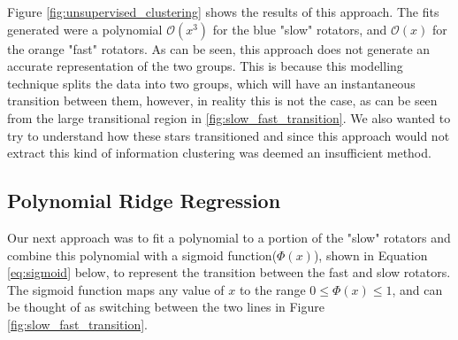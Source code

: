 \documentclass[fleqn,usenatbib]{mnras}
\begin{document}
Figure \ref{fig:unsupervised_clustering} shows the results of this approach.
The fits generated were a polynomial $\mathcal{O}(x^3)$ for the blue "slow" rotators, and $\mathcal{O}(x)$ for the orange "fast" rotators.
As can be seen, this approach does not generate an accurate representation of the two groups.
This is because this modelling technique splits the data into two groups, which will have an instantaneous transition between them, however, in reality this is not the case, as can be seen from the large transitional region in \ref{fig:slow_fast_transition}.
We also wanted to try to understand how these stars transitioned and since this approach would not extract this kind of information clustering was deemed an insufficient method.

\subsection{Polynomial Ridge Regression}
Our next approach was to fit a polynomial to a portion of the "slow" rotators and combine this polynomial with a sigmoid function($\Phi\left(x\right)$), shown in Equation \ref{eq:sigmoid} below, to represent the transition between the fast and slow rotators.
The sigmoid function maps any value of $x$ to the range $ 0 \leq \Phi\left(x\right) \leq 1$, and can be thought of as switching between the two lines in Figure \ref{fig:slow_fast_transition}.
\end{document}
